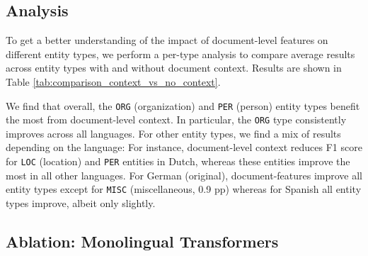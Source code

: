 \documentclass[11pt,a4paper]{article}
\begin{document}
\begin{table}
\centering
{}
\caption{Relative change in F1 for different entity types and languages when adding document-level context.}
\label{tab:comparison_context_vs_no_context}
\end{table}

\subsection{Analysis}

To get a better understanding of the impact of document-level features on different entity types, we perform a per-type analysis to compare average results across entity types with and without document context.  Results are shown in Table \ref{tab:comparison_context_vs_no_context}. 

We find that overall, the {\tt ORG} (organization) and {\tt PER} (person) entity types benefit the most from document-level context. In particular, the  {\tt ORG} type consistently improves across all languages. For other entity types, we find a mix of results depending on the language: For instance, document-level context reduces F1 score for {\tt LOC} (location) and {\tt PER} entities in Dutch, whereas these entities improve the most in all other languages. For German (original), document-features improve all entity types except for {\tt MISC} (miscellaneous, 0.9 pp) whereas for Spanish all entity types improve, albeit only slightly.






\subsection{Ablation: Monolingual Transformers}
\end{document}
